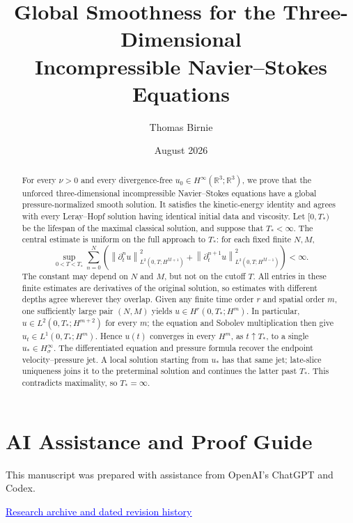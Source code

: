 \documentclass[11pt]{article}
\title{Global Smoothness for the Three-Dimensional\\
Incompressible Navier--Stokes Equations}
\author{Thomas Birnie}
\date{August 2026}
\theoremstyle{definition}
\theoremstyle{remark}
\newcommand{\R}{\mathbb R}
\newcommand{\norm}[1]{\left\lVert #1\right\rVert}
\begin{document}
\maketitle

\begin{abstract}
For every \(\nu>0\) and every divergence-free
\(u_0\in H^\infty(\R^3;\R^3)\), we prove that the unforced
three-dimensional incompressible Navier--Stokes equations have a global
pressure-normalized smooth solution.  It satisfies the kinetic-energy
identity and agrees with every Leray--Hopf solution having identical initial data and viscosity.  Let \([0,T_*)\) be the lifespan of the maximal classical solution,
and suppose that \(T_*<\infty\).
The central estimate is uniform on the full approach to \(T_*\): for each
fixed finite \(N,M\),
\[
 \sup_{0<T<T_*}
 \sum_{n=0}^{N}
 \left(
  \norm{\partial_t^n u}_{L^2(0,T;H^{M+1})}^2
  +\norm{\partial_t^{n+1}u}_{L^2(0,T;H^{M-1})}^2
 \right)<\infty.
\]
The constant may depend on \(N\) and \(M\), but not on the cutoff \(T\).
All entries in these finite estimates are derivatives of the original solution,
so estimates with different depths agree wherever they overlap.  Given any
finite time order \(r\) and spatial order \(m\), one sufficiently large pair
\((N,M)\) yields \(u\in H^r(0,T_*;H^m)\).  In particular,
\(u\in L^2(0,T_*;H^{m+2})\) for every \(m\); the equation and Sobolev
multiplication then give \(u_t\in L^1(0,T_*;H^m)\).  Hence \(u(t)\) converges
in every \(H^m\), as \(t\uparrow T_*\), to a single
\(u_*\in H^\infty_\sigma\).  The differentiated equation and pressure formula
recover the endpoint velocity--pressure jet.  A local solution starting from
\(u_*\) has that same jet; late-slice uniqueness joins it to the preterminal
solution and continues the latter past \(T_*\).  This contradicts maximality,
so \(T_*=\infty\).
\end{abstract}
\clearpage

\begingroup
\setlength{\parindent}{0pt}
\setlength{\parskip}{0.55\baselineskip}
\setlength{\abovedisplayskip}{9pt plus 2pt minus 2pt}
\setlength{\belowdisplayskip}{9pt plus 2pt minus 2pt}
\section*{AI Assistance and Proof Guide}

This manuscript was prepared with assistance from OpenAI's ChatGPT and Codex.

\href{https://github.com/Jibberfish69/navier-stokes-public}{%
  \textcolor{blue}{\underline{Research archive and dated revision history}}}
\end{document}
